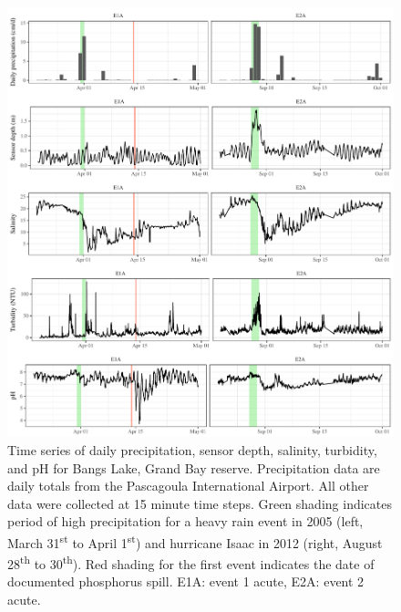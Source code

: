 \documentclass[letterpaper,12pt]{article}\usepackage[]{graphicx}\usepackage[]{color}
\makeatletter
\def\maxwidth{ %
  \ifdim\Gin@nat@width>\linewidth
    \linewidth
  \else
    \Gin@nat@width
  \fi
}
\makeatother
\begin{document}
\begin{figure}[!ht]

{\centering \includegraphics[width=\maxwidth]{figs/Fig3} 

}

\caption[Time series of daily precipitation, sensor depth, salinity, turbidity, and pH for Bangs Lake, Grand Bay reserve]{Time series of daily precipitation, sensor depth, salinity, turbidity, and pH for Bangs Lake, Grand Bay reserve.  Precipitation data are daily totals from the Pascagoula International Airport.  All other data were collected at 15 minute time steps.  Green shading indicates period of high precipitation for a heavy rain event in 2005 (left, March 31\textsuperscript{st} to April 1\textsuperscript{st}) and hurricane Isaac in 2012 (right, August 28\textsuperscript{th} to 30\textsuperscript{th}).  Red shading for the first event indicates the date of documented phosphorus spill.  E1A: event 1 acute, E2A: event 2 acute.}\label{fig:Fig3}
\end{figure}


\clearpage
\end{document}
